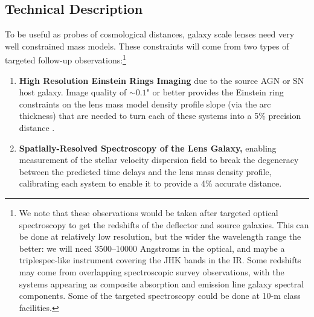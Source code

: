 
\subsection{Technical Description }




To be useful as probes of cosmological distances, galaxy scale lenses
need very well constrained mass models. These constraints will come from
two types of targeted follow-up observations:\footnote{
We note that these observations would be taken after targeted optical
spectroscopy to get the redshifts of the deflector and source galaxies.
This can be done at relatively low resolution, but the wider the
wavelength range the better: we will need 3500--10000 Angstroms in the
optical, and maybe a triplespec-like instrument covering the JHK bands
in the IR. Some redshifts may come from overlapping spectroscopic survey
observations, with the systems appearing as composite absorption and
emission line galaxy spectral components. Some of the targeted
spectroscopy could be done at 10-m class facilities.}
\begin{enumerate}
    \item {\bf High Resolution Einstein Rings Imaging} due to the
    source AGN or SN host galaxy. Image quality of $\sim0.1$" or better
    provides the Einstein ring constraints on the lens mass model
    density profile slope (via the arc thickness) that are
    needed to turn each of these systems into a  5\% precision distance
    \citep{MengEtal2015}.
    \item {\bf Spatially-Resolved Spectroscopy of the Lens Galaxy,} enabling
    measurement of the stellar velocity dispersion field to break the
    degeneracy between the predicted time delays and the lens mass
    density profile, calibrating each system to enable it to provide a
    4\% accurate distance.
\end{enumerate}

